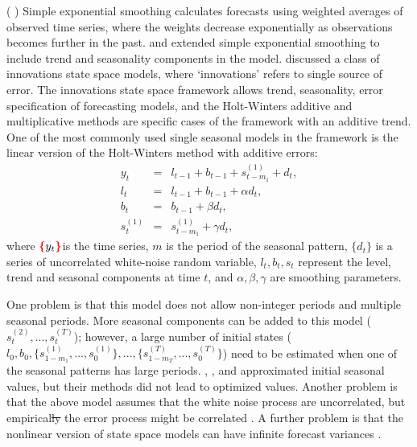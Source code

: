 \documentclass{uwstat572}
\newcommand{\vmdel}[1]{\sout{#1}}
\newcommand{\vmadd}[1]{\textbf{\color{red}{#1}}}
\newcommand{\vmcomment}[1]{({\color{blue}{VM's comment:}} \textbf{\color{blue}{#1}})}
\begin{document}
\vmcomment{The above and below paragraphs need better a better connection/transition.}
Simple exponential smoothing calculates forecasts using weighted averages of observed time series, where the weights decrease exponentially as observations becomes further in the past. \citet{holt1957forecasting} and \citet{winters1960forecasting} extended simple exponential smoothing to include trend and seasonality components in the model. \citet{hyndman2002state} discussed a class of innovations state space models, where `innovations' refers to \vmadd{a} single source of error. The innovations state space framework allows trend, seasonality, error specification of forecasting models, and the Holt-Winters additive and multiplicative methods are specific cases of the framework with an additive trend. One of the most commonly used single seasonal models in the framework is the linear version of the Holt-Winters method with additive errors:
\begin{eqnarray}
y_t &=& l_{t-1}+b_{t-1}+s_{t-m_1}^{(1)}+d_t,\\
l_t &=& l_{t-1}+b_{t-1}+\alpha d_t,\\
b_t &=& b_{t-1}+\beta d_t,\\
s_t^{(1)} &=& s_{t-m_1}^{(1)}+\gamma d_t,
\end{eqnarray}
where $\vmadd{\{}y_t\vmadd{\}}$is the time series, $m$ is the period of the seasonal pattern, $\{d_t\}$ is a series of uncorrelated white-noise random variable, $l_t, b_t, s_t$ represent the level, trend and seasonal components at time $t$, and $\alpha,\beta,\gamma$ are smoothing parameters.

One problem is that this model does not allow \vmadd{for} non-integer periods and multiple seasonal periods. More seasonal components can be added to this model\vmadd{,} ($s_t^{(2)},...,s_t^{(T)}$); however, a large number of initial states ($l_0, b_0, \{ s^{(1)}_{1-m_1}, ..., s_0^{(1)} \},...,  \{ s^{(T)}_{1-m_T}, ..., s_0^{(T)} \}$) need to be estimated when one of the seasonal patterns has large periods. \citet{taylor2003short}, \citet{taylor2010triple}, and \citet{gould2008forecasting} approximated initial seasonal values, but their methods did not lead to optimized values. \vmadd{--- I didn't understand this sentence}
Another problem is that the above model assumes that the white noise process\vmadd{es?} are uncorrelated, but \vmadd{there is} empirical\vmdel{ly} \vmadd{evidence that} the error process\vmadd{es?} might be correlated \citep{taylor2003short}. 
A further problem is that the nonlinear version of state space models can have infinite forecast variances \citep{akram2009exponential}. 
\end{document}
